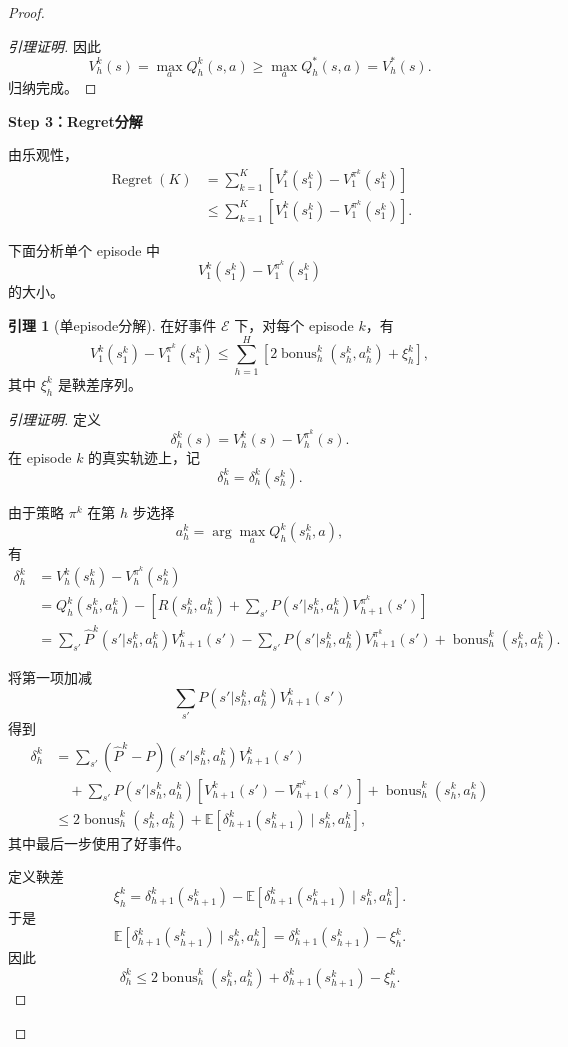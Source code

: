 \documentclass[11pt,a4paper]{article}
\theoremstyle{definition}
\newtheorem{lemma}{引理}[section]
\begin{document}
\begin{proof}
\begin{proof}[引理证明]
因此
\[
V_h^k(s)
=
\max_a Q_h^k(s,a)
\geq
\max_a Q_h^*(s,a)
=
V_h^*(s).
\]
归纳完成。
\end{proof}

\textbf{Step 3：Regret分解}

由乐观性，
\begin{align*}
\operatorname{Regret}(K)
&=
\sum_{k=1}^K
\left[
V_1^*(s_1^k)-V_1^{\pi^k}(s_1^k)
\right]
\\
&\leq
\sum_{k=1}^K
\left[
V_1^k(s_1^k)-V_1^{\pi^k}(s_1^k)
\right].
\end{align*}

下面分析单个 episode 中
\[
V_1^k(s_1^k)-V_1^{\pi^k}(s_1^k)
\]
的大小。

\begin{lemma}[单episode分解]
在好事件 $\mathcal{E}$ 下，对每个 episode \(k\)，有
\[
V_1^k(s_1^k)-V_1^{\pi^k}(s_1^k)
\leq
\sum_{h=1}^H
\left[
2\operatorname{bonus}_h^k(s_h^k,a_h^k)
+
\xi_h^k
\right],
\]
其中 \(\xi_h^k\) 是鞅差序列。
\end{lemma}

\begin{proof}[引理证明]
定义
\[
\delta_h^k(s)
=
V_h^k(s)-V_h^{\pi^k}(s).
\]
在 episode \(k\) 的真实轨迹上，记
\[
\delta_h^k
=
\delta_h^k(s_h^k).
\]

由于策略 \(\pi^k\) 在第 \(h\) 步选择
\[
a_h^k=\arg\max_a Q_h^k(s_h^k,a),
\]
有
\begin{align*}
\delta_h^k
&=
V_h^k(s_h^k)-V_h^{\pi^k}(s_h^k)
\\
&=
Q_h^k(s_h^k,a_h^k)
-
\left[
R(s_h^k,a_h^k)
+
\sum_{s'}P(s'|s_h^k,a_h^k)
V_{h+1}^{\pi^k}(s')
\right]
\\
&=
\sum_{s'}
\hat P^k(s'|s_h^k,a_h^k)V_{h+1}^k(s')
-
\sum_{s'}
P(s'|s_h^k,a_h^k)V_{h+1}^{\pi^k}(s')
+
\operatorname{bonus}_h^k(s_h^k,a_h^k).
\end{align*}

将第一项加减
\[
\sum_{s'}P(s'|s_h^k,a_h^k)V_{h+1}^k(s')
\]
得到
\begin{align*}
\delta_h^k
&=
\sum_{s'}
(\hat P^k-P)(s'|s_h^k,a_h^k)V_{h+1}^k(s')
\\
&\quad
+
\sum_{s'}
P(s'|s_h^k,a_h^k)
\left[
V_{h+1}^k(s')-V_{h+1}^{\pi^k}(s')
\right]
+
\operatorname{bonus}_h^k(s_h^k,a_h^k)
\\
&\leq
2\operatorname{bonus}_h^k(s_h^k,a_h^k)
+
\mathbb{E}
\left[
\delta_{h+1}^k(s_{h+1}^k)
\mid
s_h^k,a_h^k
\right],
\end{align*}
其中最后一步使用了好事件。

定义鞅差
\[
\xi_h^k
=
\delta_{h+1}^k(s_{h+1}^k)
-
\mathbb{E}
\left[
\delta_{h+1}^k(s_{h+1}^k)
\mid
s_h^k,a_h^k
\right].
\]
于是
\[
\mathbb{E}
\left[
\delta_{h+1}^k(s_{h+1}^k)
\mid
s_h^k,a_h^k
\right]
=
\delta_{h+1}^k(s_{h+1}^k)-\xi_h^k.
\]
因此
\[
\delta_h^k
\leq
2\operatorname{bonus}_h^k(s_h^k,a_h^k)
+
\delta_{h+1}^k(s_{h+1}^k)
-
\xi_h^k.
\]


\end{proof}
\end{proof}
\end{document}
